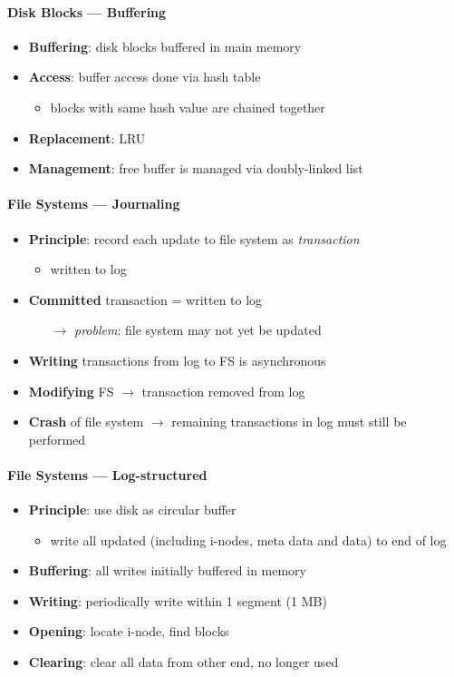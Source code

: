 \paragraph{Disk Blocks --- Buffering}
\begin{itemize}
  \item \textbf{Buffering}: disk blocks buffered in main memory
  \item \textbf{Access}: buffer access done via hash table
  \begin{itemize}
    \item blocks with same hash value are chained together
  \end{itemize}
  \item \textbf{Replacement}: LRU
  \item \textbf{Management}: free buffer is managed via doubly-linked list
\end{itemize}

\paragraph{File Systems --- Journaling}
\begin{itemize}
  \item \textbf{Principle}: record each update to file system as \emph{transaction}
  \begin{itemize}
    \item written to log
  \end{itemize}
  \item \textbf{Committed} transaction = written to log
  \begin{itemize}
    \item[$ \to $] \emph{problem}: file system may not yet be updated
  \end{itemize}
  \item \textbf{Writing} transactions from log to FS is asynchronous
  \item \textbf{Modifying} FS $ \to $ transaction removed from log
  \item \textbf{Crash} of file system $ \to $ remaining transactions in log must still be performed
\end{itemize}

\paragraph{File Systems --- Log-structured}
\begin{itemize}
  \item \textbf{Principle}: use disk as circular buffer
  \begin{itemize}
    \item write all updated (including i-nodes, meta data and data) to end of log
  \end{itemize}
  \item \textbf{Buffering}: all writes initially buffered in memory
  \item \textbf{Writing}: periodically write within 1 segment (1 MB)
  \item \textbf{Opening}: locate i-node, find blocks
  \item \textbf{Clearing}: clear all data from other end, no longer used
\end{itemize}